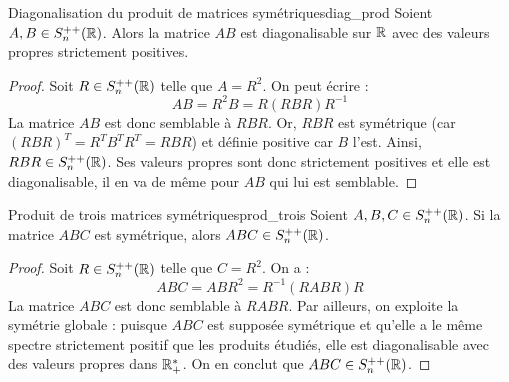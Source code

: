 \lvspace \avspace {}

\begin{proposition}{Diagonalisation du produit de matrices symétriques}{diag_prod}
    Soient $A, B \in S_n^{++}(\mathbb{R})$. Alors la matrice $AB$ est diagonalisable sur $\mathbb{R}$ avec des valeurs propres strictement positives.
\end{proposition}

\begin{proof}
    Soit $R \in S_n^{++}(\mathbb{R})$ telle que $A = R^2$. On peut écrire :
    \[ AB = R^2 B = R(RBR)R^{-1} \]
    La matrice $AB$ est donc semblable à $RBR$. Or, $RBR$ est symétrique (car $(RBR)^T = R^T B^T R^T = RBR$) et définie positive car $B$ l'est. 
    Ainsi, $RBR \in S_n^{++}(\mathbb{R})$. Ses valeurs propres sont donc strictement positives et elle est diagonalisable, il en va de même pour $AB$ qui lui est semblable.
\end{proof}

\begin{proposition}{Produit de trois matrices symétriques}{prod_trois}
    Soient $A, B, C \in S_n^{++}(\mathbb{R})$. Si la matrice $ABC$ est symétrique, alors $ABC \in S_n^{++}(\mathbb{R})$.
\end{proposition}

\begin{proof}
    Soit $R \in S_n^{++}(\mathbb{R})$ telle que $C = R^2$. On a :
    \[ ABC = ABR^2 = R^{-1}(RABR)R \]
    La matrice $ABC$ est donc semblable à $RABR$. Par ailleurs, on exploite la symétrie globale : puisque $ABC$ est supposée symétrique et qu'elle a le même spectre strictement positif que les produits étudiés, elle est diagonalisable avec des valeurs propres dans $\mathbb{R}_+^*$. On en conclut que $ABC \in S_n^{++}(\mathbb{R})$.
\end{proof}